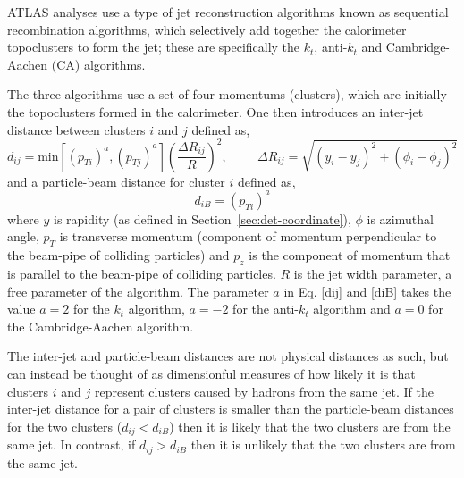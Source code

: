 ATLAS analyses use a type of jet reconstruction algorithms known as sequential recombination algorithms,
which selectively add together the calorimeter topoclusters to form the jet;
these are specifically the $k_t$, anti-$k_t$ and Cambridge-Aachen (CA) algorithms.

The three algorithms use a set of four-momentums (clusters), which are initially the topoclusters formed in the calorimeter.
One then introduces an inter-jet distance between clusters $i$ and $j$ defined as,
\begin{equation}
  d_{ij} = \text{min}
  [(p_{ Ti})^a, (p_{ Tj})^a]  \left(\frac{\Delta  R_{ij}}{R}\right) ^2, \hspace{1cm} \Delta R_{ij} = \sqrt{(y_{i} - y_{j})^2 + (\phi_{i} - \phi_{j})^2} \label{dij}
\end{equation}
\noindent and a particle-beam distance for cluster $i$ defined as,
\begin{equation}
  d_{iB} = (p_{Ti})^a \label{diB}
\end{equation}
where $y$  is rapidity (as defined in Section~\ref{sec:det-coordinate}), $\phi$ is azimuthal angle,
$p_T$ is transverse momentum (component of momentum perpendicular to the beam-pipe of colliding particles)
and $p_z$ is the component of momentum that is parallel to the beam-pipe of colliding particles.
$R$ is the jet width parameter, a free parameter of the algorithm.
The parameter $a$ in Eq. \eqref{dij} and \eqref{diB} takes the value $a = 2$ for the $k_t$ algorithm, $a = -2$ for the anti-$k_t$ algorithm 
and  $a = 0$ for the Cambridge-Aachen algorithm.

The inter-jet and particle-beam distances are not physical distances as such, but can instead be thought of as dimensionful measures of how likely it is that
clusters $i$ and $j$ represent clusters caused by hadrons from the same jet.
If the inter-jet distance for a pair of clusters is smaller than the particle-beam distances for the two clusters ($d_{ij} < d_{iB}$) 
then it is likely that the two clusters are from the same jet. 
In contrast, if $d_{ij} > d_{iB}$ then it is unlikely that the two clusters are from the same jet.
 
